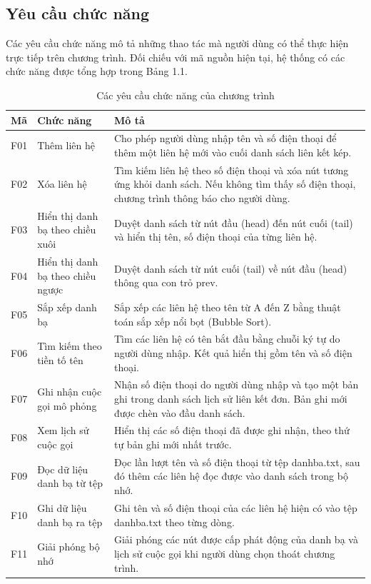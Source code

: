 \documentclass[12pt,a4paper]{report}
\begin{document}
\subsection{Yêu cầu chức năng}

Các yêu cầu chức năng mô tả những thao tác mà người dùng có thể thực hiện trực tiếp trên chương trình. Đối chiếu với mã nguồn hiện tại, hệ thống có các chức năng được tổng hợp trong Bảng 1.1.\par
\begin{table}[htbp]\centering\caption{Các yêu cầu chức năng của chương trình}\label{tab:chucnang}
\begin{tabularx}{\textwidth}{|>{\centering\arraybackslash}p{1.1cm}|p{3.4cm}|X|}\hline\textbf{Mã} & \textbf{Chức năng} & \textbf{Mô tả} \\ \hline
F01 & Thêm liên hệ & Cho phép người dùng nhập tên và số điện thoại để thêm một liên hệ mới vào cuối danh sách liên kết kép. \\ \hline
F02 & Xóa liên hệ & Tìm kiếm liên hệ theo số điện thoại và xóa nút tương ứng khỏi danh sách. Nếu không tìm thấy số điện thoại, chương trình thông báo cho người dùng. \\ \hline
F03 & Hiển thị danh bạ theo chiều xuôi & Duyệt danh sách từ nút đầu (head) đến nút cuối (tail) và hiển thị tên, số điện thoại của từng liên hệ. \\ \hline
F04 & Hiển thị danh bạ theo chiều ngược & Duyệt danh sách từ nút cuối (tail) về nút đầu (head) thông qua con trỏ prev. \\ \hline
F05 & Sắp xếp danh bạ & Sắp xếp các liên hệ theo tên từ A đến Z bằng thuật toán sắp xếp nổi bọt (Bubble Sort). \\ \hline
F06 & Tìm kiếm theo tiền tố tên & Tìm các liên hệ có tên bắt đầu bằng chuỗi ký tự do người dùng nhập. Kết quả hiển thị gồm tên và số điện thoại. \\ \hline
F07 & Ghi nhận cuộc gọi mô phỏng & Nhận số điện thoại do người dùng nhập và tạo một bản ghi trong danh sách lịch sử liên kết đơn. Bản ghi mới được chèn vào đầu danh sách. \\ \hline
F08 & Xem lịch sử cuộc gọi & Hiển thị các số điện thoại đã được ghi nhận, theo thứ tự bản ghi mới nhất trước. \\ \hline
F09 & Đọc dữ liệu danh bạ từ tệp & Đọc lần lượt tên và số điện thoại từ tệp danhba.txt, sau đó thêm các liên hệ đọc được vào danh sách trong bộ nhớ. \\ \hline
F10 & Ghi dữ liệu danh bạ ra tệp & Ghi tên và số điện thoại của các liên hệ hiện có vào tệp danhba.txt theo từng dòng. \\ \hline
F11 & Giải phóng bộ nhớ & Giải phóng các nút được cấp phát động của danh bạ và lịch sử cuộc gọi khi người dùng chọn thoát chương trình. \\ \hline
\end{tabularx}\end{table}
\end{document}

